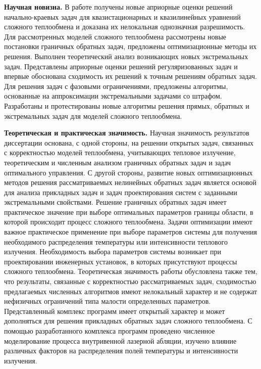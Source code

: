     \textbf{Научная новизна.}
    В работе получены новые априорные оценки решений
    начально-краевых задач для квазистационарных и квазилинейных уравнений
    сложного теплообмена и доказана их нелокальная однозначная
    разрешимость.
    Для рассмотренных моделей сложного теплообмена
    рассмотрены новые постановки граничных обратных задач, предложены
    оптимизационные методы их решения.
    Выполнен теоретический анализ возникающих новых экстремальных задач.
    Представлены априорные оценки решений регуляризованных задач и впервые
    обоснована сходимость их решений к точным решениям обратных задач.
    Для решения задач с фазовыми ограничениями, предложены алгоритмы,
    основанные на аппроксимации экстремальными задачами со штрафом.
    Разработаны и протестированы новые алгоритмы решения прямых,
    обратных и экстремальных задач для моделей сложного теплообмена.


    \textbf{Теоретическая и практическая значимость.}
    Научная значимость результатов диссертации основана, с одной
    стороны, на решении открытых задач, связанных с корректностью моделей
    теплообмена, учитывающих тепловое излучение, теоретическим и
    численным анализом граничных обратных задач и задач оптимального
    управления.
    С другой стороны, развитие новых оптимизационных методов
    решения рассматриваемых нелинейных обратных задач является основой для
    анализа прикладных задач и задач проектирования систем с заданными
    экстремальными свойствами.
    Решение граничных обратных задач имеет практическое значение при
    выборе оптимальных параметров границы области, в которой происходит
    процесс сложного теплообмена.
    Задачи оптимизации имеют важное
    практическое применение при выборе параметров системы для получения
    необходимого распределения температуры или интенсивности теплового излучения.
    Необходимость выбора параметров системы возникает при проектировании
    инженерных установок, в которых присутствуют процессы сложного
    теплообмена.
    Теоретическая значимость работы обусловлена также тем, что
    результаты, связанные с корректностью рассматриваемых задач,
    сходимостью предлагаемых численных алгоритмов имеют нелокальный
    характер и не содержат нефизичных ограничений типа малости
    определенных параметров.
    Представленный комплекс программ имеет открытый характер и может
    дополняться для решения прикладных обратных задач сложного
    теплообмена.
    С помощью разработанного комплекса программ проведено численное
    моделирование процесса внутривенной лазерной абляции, изучено влияние
    различных факторов на распределения полей температуры и интенсивности
    излучения.


